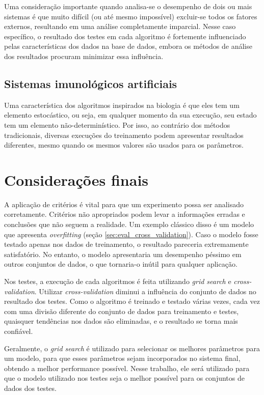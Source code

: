 Uma consideração importante quando analisa-se o desempenho de dois ou mais sistemas é que muito difícil (ou até mesmo impossível) excluir-se todos os fatores externos, resultando em uma análise completamente imparcial. Nesse caso específico, o resultado dos testes em cada algoritmo é fortemente influenciado pelas características dos dados na base de dados, embora os métodos de análise dos resultados procuram minimizar essa influência.

\subsection{Sistemas imunológicos artificiais}

Uma característica dos algoritmos inspirados na biologia é que eles tem um elemento estocástico, ou seja, em qualquer momento da sua execução, seu estado tem um elemento não-determinístico. Por isso, ao contrário dos métodos tradicionais, diversas execuções do treinamento podem apresentar resultados diferentes, mesmo quando os mesmos valores são usados para os parâmetros.

\section{Considerações finais}

A aplicação de critérios é vital para que um experimento possa ser analisado corretamente. Critérios não apropriados podem levar a informações erradas e conclusões que não seguem a realidade. Um exemplo clássico disso é um modelo que apresenta \emph{overfitting} (seção \ref{sec:eval_cross_validation}). Caso o modelo fosse testado apenas nos dados de treinamento, o resultado pareceria extremamente satisfatório. No entanto, o modelo apresentaria um desempenho péssimo em outros conjuntos de dados, o que tornaria-o inútil para qualquer aplicação.

Nos testes, a execução de cada algoritmos é feita utilizando \emph{grid search} e \emph{cross-validation}. Utilizar \emph{cross-validation} diminui a influência do conjunto de dados no resultado dos testes. Como o algoritmo é treinado e testado várias vezes, cada vez com uma divisão diferente do conjunto de dados para treinamento e testes, quaisquer tendências nos dados são eliminadas, e o resultado se torna mais confiável.

Geralmente, o \emph{grid search} é utilizado para selecionar os melhores parâmetros para um modelo, para que esses parâmetros sejam incorporados no sistema final, obtendo a melhor performance possível. Nesse trabalho, ele será utilizado para que o modelo utilizado nos testes seja o melhor possível para os conjuntos de dados dos testes.

